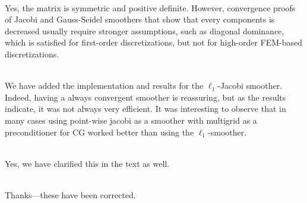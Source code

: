 \documentclass[12pt]{article}
\newcommand{\referee}[1]{\vspace{3ex}\noindent{\textcolor{blue}{#1}}\\[2ex]}
\begin{document}
\referee{ 3) It looks like SSOR is amplifying some error components
  when used as a smoother in Figure 3 (e.g. for p=4). Isn't Ak SPD in
  this case?}
\noindent
Yes, the matrix is symmetric and positive definite. However,
convergence proofs of Jacobi and Gauss-Seidel smoothers that show that
every components is decreased usually require stronger assumptions,
such as diagonal dominance, which is satisfied for first-order
discretizations, but not for high-order FEM-based discretizations.

\referee{ 4) Have you tried using the $\ell_1$-Jacobi smoother from [2]?
  This smoother is always convergent, so it may approve the results of
  e.g. Table II.}
\noindent
We have added the implementation and results for the $\ell_1$-Jacobi smoother. Indeed,
having a always convergent smoother is reassuring, but as the results indicate, it 
was not always very efficient. It was interesting to observe that in many cases using
point-wise jacobi as a smoother with multigrid as a preconditioner for CG worked better
than using the $\ell_1$-smoother.

\referee{ 5) What is the coarse grid in Section 3.2.2, the one
  obtained by h-coarsening (and interpolation)?}
\noindent
Yes, we have clarified this in the text as well.

\referee{ 6) A few typos: "loose" on page 1, "corresponds" on page 4,
  extra "rate" on page 7.}
\noindent
Thanks---these have been corrected.




\end{document}
